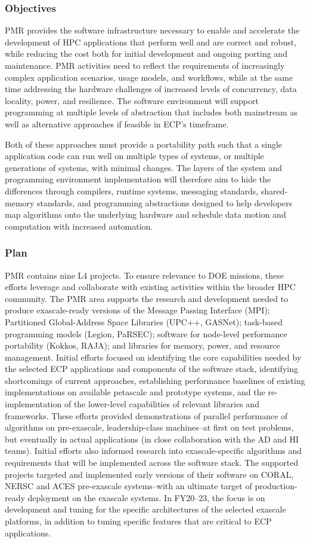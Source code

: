 \subsubsection{Objectives}
PMR provides the software infrastructure necessary to enable and accelerate the development of HPC applications that perform well and are correct and robust, while reducing the cost both for initial development and ongoing porting and maintenance. PMR activities need to reflect the requirements of increasingly complex application scenarios, usage models, and workflows, while at the same time addressing the hardware challenges of increased levels of concurrency, data locality, power, and resilience. The software environment will support programming at multiple levels of abstraction that includes both mainstream as well as alternative approaches if feasible in ECP’s timeframe. 

Both of these approaches must provide a portability path such that a single application code can run well on multiple types of systems, or multiple generations of systems, with minimal changes. The layers of the system and programming environment implementation will therefore aim to hide the differences through compilers, runtime systems, messaging standards, shared-memory standards, and programming abstractions designed to help developers map algorithms onto the underlying hardware and schedule data motion and computation with increased automation.
\subsubsection{Plan}
PMR contains nine L4 projects. To ensure relevance to DOE missions, these efforts leverage and collaborate with existing activities within the broader HPC community. The PMR area supports the research and development needed to produce exascale-ready versions of the Message Passing Interface (MPI);  Partitioned Global-Address Space Libraries (UPC++, GASNet); task-based programming models (Legion, PaRSEC); software for node-level performance portability (Kokkos, RAJA); and libraries for memory, power, and resource management.
Initial efforts focused on identifying the core capabilities needed by the selected ECP applications and components of the software stack, identifying shortcomings of current approaches, establishing performance baselines of existing implementations on available petascale and prototype systems, and the re-implementation of the lower-level capabilities of relevant libraries and frameworks. These efforts provided demonstrations of parallel performance of algorithms on pre-exascale, leadership-class machines--at first on test problems, but eventually in actual applications (in close collaboration with the AD and HI teams). Initial efforts also informed research into exascale-specific algorithms and requirements that will be implemented across the software stack. The supported projects targeted and implemented early versions of their software on CORAL, NERSC and ACES pre-exascale systems--with an ultimate target of production-ready deployment on the exascale systems.
In FY20--23, the focus is on development and tuning for the specific architectures of the selected exascale platforms, in addition to tuning specific features that are critical to ECP applications.

